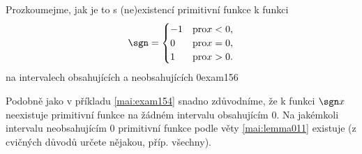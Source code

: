 \begin{mathexam}{Prozkoumejme, jak je to s (ne)existencí primitivní funkce k funkci
  \begin{equation*}
    \sgn = 
      \begin{cases}
         -1 & \text{pro} x<0, \\
          0 & \text{pro} x=0, \\
          1 & \text{pro} x>0.
      \end{cases}
  \end{equation*}
  na intervalech obsahujících a neobsahujících \(0\)}{exam156} 

  {\centering
    \captionsetup{type=figure} 
    \label{mai:fig079}
  \par}
  
  Podobně jako v příkladu \ref{mai:exam154} snadno zdůvodníme, že k funkci \(\sgn x\) neexistuje
  primitivní funkce na žádném intervalu obsahujícím \(0\). Na jakémkoli intervalu neobsahujícím
  \(0\) primitivní funkce podle věty \eqref{mai:lemma011} existuje (z cvičných důvodů určete
  nějakou, příp. všechny). 
\end{mathexam}